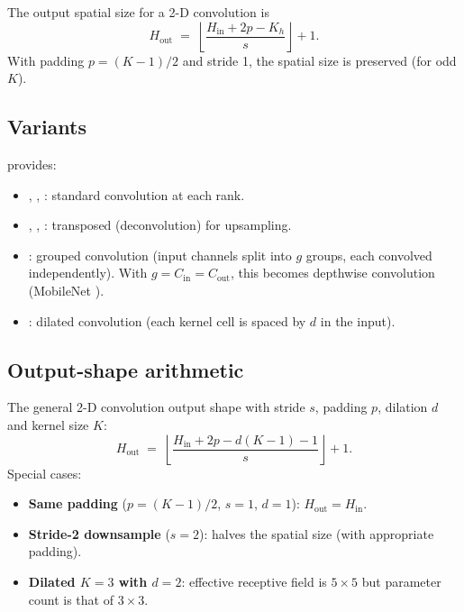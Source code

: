 The output spatial size for a 2-D convolution is
\[
H_{\text{out}} \;=\; \left\lfloor \frac{H_{\text{in}} + 2p - K_h}{s} \right\rfloor + 1.
\]
With padding $p = (K-1)/2$ and stride 1, the spatial size is
preserved (for odd $K$).

\subsection{Variants}
\label{ssec:linear_conv_norm:conv_variants}

 provides:
\begin{itemize}
  \item {}, , : standard
    convolution at each rank.
  \item {}, ,
    : transposed (deconvolution) for
    upsampling.
  \item {}: grouped convolution (input
    channels split into $g$ groups, each convolved independently).
    With $g = C_{\text{in}} = C_{\text{out}}$, this becomes depthwise
    convolution (MobileNet \cite{howard_mobilenet_2017}).
  \item {}: dilated convolution (each kernel
    cell is spaced by $d$ in the input).
\end{itemize}

\subsection{Output-shape arithmetic}
\label{ssec:linear_conv_norm:conv_arithmetic}

The general 2-D convolution output shape with stride $s$,
padding $p$, dilation $d$ and kernel size $K$:
\[
  H_{\text{out}} \;=\;
  \left\lfloor
  \frac{H_{\text{in}} + 2p - d(K - 1) - 1}{s}
  \right\rfloor + 1.
\]
Special cases:

\begin{itemize}
  \item \textbf{Same padding} ($p = (K-1)/2$, $s = 1$, $d = 1$):
    $H_{\text{out}} = H_{\text{in}}$.
  \item \textbf{Stride-2 downsample} ($s = 2$): halves the
    spatial size (with appropriate padding).
  \item \textbf{Dilated $K = 3$ with $d = 2$}: effective
    receptive field is $5 \times 5$ but parameter count is
    that of $3 \times 3$.
\end{itemize}


